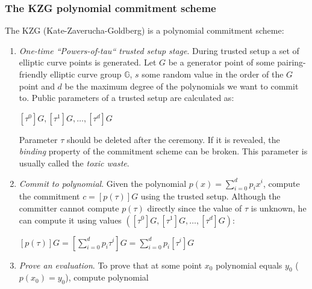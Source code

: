 \documentclass[../lecture-notes-148x210.tex]{subfiles}
\begin{document}
\subsubsection{The KZG polynomial commitment scheme}

The KZG (Kate-Zaverucha-Goldberg) is a polynomial commitment scheme:

\begin{enumerate}
    \item \textit{One-time ``Powers-of-tau`` trusted setup stage}. During trusted setup a set of elliptic curve points is generated. 
    Let $G$ be a generator point of some pairing-friendly
    elliptic curve group $\mathbb{G}$, $s$ some random value in the order of the $G$ point and $d$ be the maximum degree 
    of the polynomials we want to commit to.
    Public parameters of a trusted setup are calculated as:

    \vspace{-3mm}

    \begin{center}
        $[\tau^0]G, [\tau^1]G, \ldots, [\tau^d]G$
    \end{center}

    \vspace{-1mm}

    Parameter $\tau$ should be deleted after the ceremony. If it is revealed, the \textit{binding} property of the commitment scheme can be broken. 
    This parameter is usually called the \textit{toxic waste}.
    
    \item \textit{Commit to polynomial}. Given the polynomial $p(x) = \sum_{i = 0}^{d} p_i x^i$, compute the commitment $c = [p(\tau)]G $ 
    using the trusted setup. Although the committer cannot compute $p(\tau)$ directly since the value of $\tau$ is unknown, he can
    compute it using values $([\tau^0]G, [\tau^1]G, \ldots, [\tau^d]G)$:
    
    \vspace{-1mm}

    \begin{center}
       $ [p(\tau)]G = [\sum_{i=0}^{d} p_i \tau^i]G = \sum_{i=0}^{d}p_i[\tau^i]G$
    \end{center}
    
    \vspace{-1mm}

    \item \textit{Prove an evaluation}. To prove that at some point $x_0$ polynomial equals $y_0$ ($p(x_0) = y_0$), compute polynomial
    

\end{enumerate}
\end{document}
